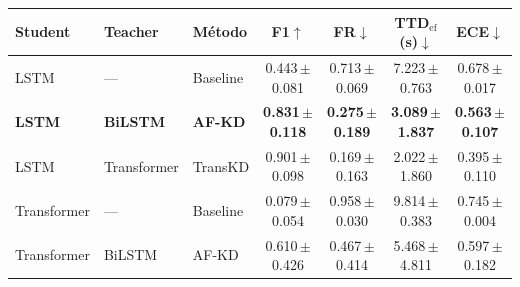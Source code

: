 \begin{tabular}{lllcccc}
\toprule
\textbf{Student} & \textbf{Teacher} & \textbf{Método} & \textbf{F1}$\uparrow$ & \textbf{FR}$\downarrow$ & \textbf{TTD$_{\text{ef}}$(s)}$\downarrow$ & \textbf{ECE}$\downarrow$ \\
\midrule
LSTM & — & Baseline & 0.443\,{\tiny$\pm$0.081} & 0.713\,{\tiny$\pm$0.069} & 7.223\,{\tiny$\pm$0.763} & 0.678\,{\tiny$\pm$0.017} \\
\textbf{LSTM} & \textbf{BiLSTM} & \textbf{AF-KD} & \textbf{0.831\,{\tiny$\pm$0.118}} & \textbf{0.275\,{\tiny$\pm$0.189}} & \textbf{3.089\,{\tiny$\pm$1.837}} & \textbf{0.563\,{\tiny$\pm$0.107}} \\
LSTM & Transformer & TransKD & 0.901\,{\tiny$\pm$0.098} & 0.169\,{\tiny$\pm$0.163} & 2.022\,{\tiny$\pm$1.860} & 0.395\,{\tiny$\pm$0.110} \\
\midrule
Transformer & — & Baseline & 0.079\,{\tiny$\pm$0.054} & 0.958\,{\tiny$\pm$0.030} & 9.814\,{\tiny$\pm$0.383} & 0.745\,{\tiny$\pm$0.004} \\
Transformer & BiLSTM & AF-KD & 0.610\,{\tiny$\pm$0.426} & 0.467\,{\tiny$\pm$0.414} & 5.468\,{\tiny$\pm$4.811} & 0.597\,{\tiny$\pm$0.182} \\
\bottomrule
\end{tabular}


